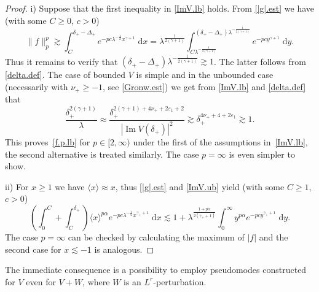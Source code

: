 \begin{proof}
i) Suppose that the first inequality in \eqref{ImV.lb} holds. From \eqref{|g|.est} we have (with some $C \geq 0$, $c>0$)
\begin{equation}
\|f\|_p^p 
{\gtrsim} 
\int_C^{\delta_+-\Delta_+}  e^{-pc \lambda^{-\frac12}  x^{\gamma+1}}  \; {\mathrm{d}} x
= 
\lambda^\frac1{2(\gamma+1)} \int_{C\lambda^{-\frac1{2(\gamma+1)}}}^{(\delta_+-\Delta_+) \lambda^{-\frac1{2(\gamma+1)}}} e^{-pc y^{\gamma+1}}  \; {\mathrm{d}} y.
\end{equation}
Thus it remains to verify that $(\delta_+-\Delta_+) \lambda^{-\frac1{2(\gamma+1)}} {\gtrsim} 1$. The latter follows from \eqref{delta.def}. The case of bounded $V$ is simple and in the unbounded case (necessarily with $\nu_+ \geq -1$, see \eqref{Gronw.est}) we get from \eqref{ImV.lb} and \eqref{delta.def} that
\begin{equation}
\frac{\delta_+^{2(\gamma+1)}}{\lambda }
\approx
\frac{\delta_+^{2(\gamma+1) + 4 \nu_+ + 2 {\varepsilon}_1 +2}}{|{\operatorname{Im}} V(\delta_+)|^2}
{\gtrsim} \delta_+^{4\nu_+ + 4 + 2 {\varepsilon}_1} {\gtrsim} 1.
\end{equation}
This proves~\eqref{f.p.lb} for $p \in [2,\infty)$
under the first of the assumptions in~\eqref{ImV.lb},
the second alternative is treated similarly.
The case $p=\infty$ is even simpler to show.

ii) For $x \geq 1$ we have $\langle x \rangle \approx x$, thus \eqref{|g|.est} and \eqref{ImV.ub} yield (with some $C \geq 1$, $c>0$)
\begin{equation}
\left( \int_0^C +  \int_C^{\delta_+} \right) \langle x \rangle^{p\alpha} e^{-p c \lambda^{-\frac 12} x^{\gamma_+ + 1}} \; {\mathrm{d}} x
{\lesssim}
1+
\lambda^\frac{1+p \alpha}{2(\gamma_++1)}
\int_0^{\infty}  y^{p\alpha} e^{-p c y^{\gamma_+ + 1}} \; {\mathrm{d}} y.
\end{equation}
The case $p=\infty$ can be checked by calculating the maximum of $|f|$ and the second case for $x {\lesssim} -1$ is analogous.
\end{proof}

The immediate consequence is a possibility to employ pseudomodes constructed for $V$ even for $V+W$, where $W$ is an $L^r$-perturbation. 

